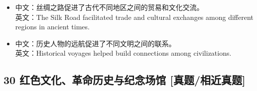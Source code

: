 \documentclass[a4paper,11pt,UTF8,fontset=none]{ctexart}
\begin{document}
\par

\begin{itemize}[leftmargin=1.7em,itemsep=1pt,parsep=0pt,topsep=2pt]
\item \noindent 中文：丝绸之路促进了古代不同地区之间的贸易和文化交流。\\ 英文：The Silk Road facilitated trade and cultural exchanges among different regions in ancient times.\par


\item \noindent 中文：历史人物的远航促进了不同文明之间的联系。\\ 英文：Historical voyages helped build connections among civilizations.\par


\end{itemize}

\subsection{30 红色文化、革命历史与纪念场馆 {\color{AccentBlue} [真题/相近真题]}}
\end{document}
